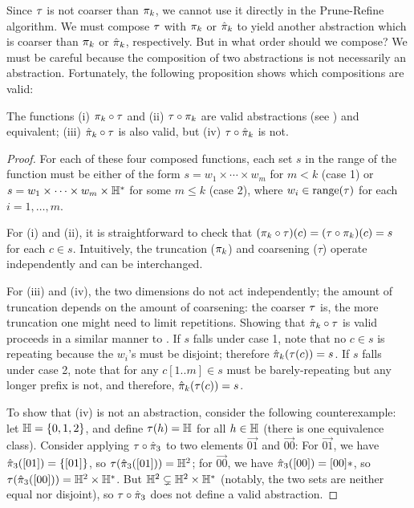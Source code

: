 Since $\tau$ is not coarser than $\pi_k$, we cannot
use it directly in the Prune-Refine algorithm.
We must compose $\tau$ with $\pi_k$ or $\hat{\pi}_k$ to yield another
abstraction which is coarser than $\pi_k$ or $\hat{\pi}_k$,
respectively.  But in what order should we compose?
We must be careful because the composition of two abstractions is not necessarily an abstraction.
Fortunately, the following proposition shows which compositions are valid:
\begin{proposition}
The functions
(i) $\pi_k \circ \tau$ and (ii) $\tau \circ \pi_k$
are valid abstractions (see ) and equivalent;
(iii) $\hat{\pi}_k \circ \tau$ is also valid,
but (iv) $\tau \circ \hat{\pi}_k$ is not.
\end{proposition}
\begin{proof}
For each of these four composed functions, each set $s$ in the range of the function
must be either of the form $s = w_1 \times \cdots \times w_m$ for $m < k$ (case 1)
or $s = w_1 \times \cdots \times w_m \times {\mathbb H}^*$ for some $m \le k$ (case 2),
where $w_i \in \text{\rm range}(\tau)$ for each $i = 1, \dots, m$.

For (i) and (ii), it is straightforward to check that
$(\pi_k \circ \tau)(c) = (\tau \circ \pi_k)(c) = s$ for each $c \in s$.
Intuitively, the truncation ($\pi_k$) and coarsening ($\tau$) operate
independently and can be interchanged.

For (iii) and (iv), the two dimensions do not act independently;
the amount of truncation depends on the amount of coarsening:
the coarser $\tau$ is, the more truncation one might need to limit repetitions.
Showing that $\hat{\pi}_k \circ \tau$ is valid
proceeds in a similar manner to .
If $s$ falls under case 1, note that no $c \in s$ is repeating
because the $w_i$'s must be disjoint; therefore $\hat{\pi}_k(\tau(c)) = s$.
If $s$ falls under case 2, note that for any $c[1..m] \in s$ must be barely-repeating but any longer prefix is not,
and therefore, $\hat{\pi}_k(\tau(c)) = s$.

To show that (iv) is not an abstraction,
consider the following counterexample:
let ${\mathbb H} = \{ 0,1,2 \}$,
and define $\tau(h) = {\mathbb H}$ for all $h \in {\mathbb H}$
(there is one equivalence class).
Consider applying $\tau \circ \hat{\pi}_3$ to two elements $\vec{01}$ and $\vec{00}$:
For $\vec{01}$, we have $\hat{\pi}_3([01]) = \{ [01 ]\}$,
so $\tau(\hat{\pi}_3([01])) = {\mathbb H}^2$;
for $\vec{00}$, we have $\hat{\pi}_3([00]) = [00]*$,
so $\tau(\hat{\pi}_3([00])) = {\mathbb H}^2 \times {\mathbb H}^*$.
But ${\mathbb H}^2 \subsetneq {\mathbb H}^2 \times {\mathbb H}^*$ (notably,
the two sets are neither equal nor disjoint),
so $\tau \circ \hat{\pi}_3$ does not define a valid abstraction.
\end{proof}

